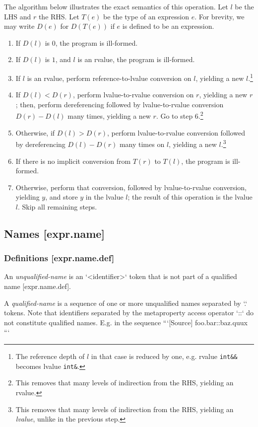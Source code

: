 \documentclass[a4paper, 12pt, oneside, final]{article}
\def\sref[#1]{[#1]}
\begin{document}
The algorithm below illustrates the exact semantics of this operation. Let $l$ be the LHS and $r$ the RHS. Let $T(e)$
be the type of an expression $e$. For brevity, we may write $D(e)$ for $D(T(e))$ if $e$ is defined to be an expression.
\begin{enumerate}
\item If $D(l)$ is $0$, the program is ill-formed.
\item If $D(l)$ is $1$, and $l$ is an rvalue, the program is ill-formed.
\item If $l$ is an rvalue, perform reference-to-lvalue conversion on $l$, yielding a new $l$.\footnote{The reference
      depth of $l$ in that case is reduced by one, e.g. rvalue \texttt{int\&\&} becomes lvalue \texttt{int\&}.}
\item If $D(l) < D(r)$, perform lvalue-to-rvalue conversion on $r$, yielding a new $r$; then,
      perform dereferencing followed by lvalue-to-rvalue conversion $D(r) - D(l)$ many times, yielding a new $r$. Go
      to step 6.\footnote{This removes that many levels of indirection from the RHS, yielding an rvalue.}
\item Otherwise, if $D(l) > D(r)$, perform lvalue-to-rvalue conversion followed by dereferencing $D(l) - D(r)$ many
      times on $l$, yielding a new $l$.\footnote{This removes that many levels of indirection from the
      RHS, yielding an \emph{lvalue}, unlike in the previous step.}
\item If there is no implicit conversion from $T(r)$ to $T(l)$, the program is ill-formed.
\item Otherwise, perform that conversion, followed by lvalue-to-rvalue conversion, yielding $y$, and store $y$
      in the lvalue $l$; the result of this operation is the lvalue $l$. Skip all remaining steps.
\end{enumerate}

\subsection{Names [expr.name]}
\subsubsection{Definitions [expr.name.def]}
An \emph{unqualified-name} is an `<identifier>` token that is not part of a qualified name \sref[expr.name.def].

A \emph{qualified-name} is a sequence of one or more unqualified names separated by `.` tokens. Note that identifiers
separated by the metaproperty access operator `::` do not constitute qualified names. E.g. in the sequence
```[Source]
foo.bar::baz.quux
```
\end{document}
